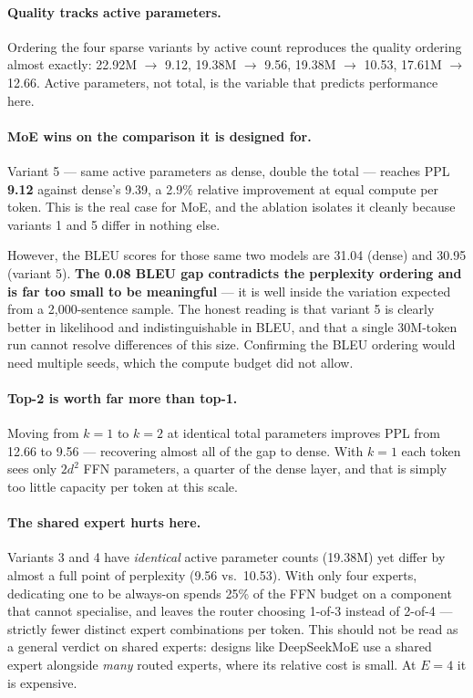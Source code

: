 \documentclass[11pt]{article}
\newcommand{\best}[1]{\textbf{#1}}
\begin{document}
\paragraph{Quality tracks active parameters.} Ordering the four sparse variants
by active count reproduces the quality ordering almost exactly: 22.92M
$\rightarrow$ 9.12, 19.38M $\rightarrow$ 9.56, 19.38M $\rightarrow$ 10.53,
17.61M $\rightarrow$ 12.66. Active parameters, not total, is the variable that
predicts performance here.

\paragraph{MoE wins on the comparison it is designed for.} Variant 5 --- same
active parameters as dense, double the total --- reaches PPL \best{9.12} against
dense's 9.39, a 2.9\% relative improvement at equal compute per token. This is
the real case for MoE, and the ablation isolates it cleanly because variants 1
and 5 differ in nothing else.

However, the BLEU scores for those same two models are 31.04 (dense) and 30.95
(variant 5). \textbf{The 0.08 BLEU gap contradicts the perplexity ordering and is
far too small to be meaningful} --- it is well inside the variation expected from
a 2{,}000-sentence sample. The honest reading is that variant 5 is clearly better
in likelihood and indistinguishable in BLEU, and that a single 30M-token run
cannot resolve differences of this size. Confirming the BLEU ordering would need
multiple seeds, which the compute budget did not allow.

\paragraph{Top-2 is worth far more than top-1.} Moving from $k{=}1$ to $k{=}2$ at
identical total parameters improves PPL from 12.66 to 9.56 --- recovering almost
all of the gap to dense. With $k{=}1$ each token sees only $2d^2$ FFN
parameters, a quarter of the dense layer, and that is simply too little capacity
per token at this scale.

\paragraph{The shared expert hurts here.} Variants 3 and 4 have \emph{identical}
active parameter counts (19.38M) yet differ by almost a full point of perplexity
(9.56 vs.\ 10.53). With only four experts, dedicating one to be always-on spends
25\% of the FFN budget on a component that cannot specialise, and leaves the
router choosing 1-of-3 instead of 2-of-4 --- strictly fewer distinct expert
combinations per token. This should not be read as a general verdict on shared
experts: designs like DeepSeekMoE \citep{dai2024deepseekmoe} use a shared expert
alongside \emph{many} routed experts, where its relative cost is small. At
$E{=}4$ it is expensive.
\end{document}
